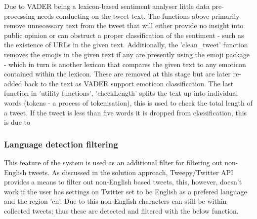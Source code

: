 \documentclass[oneside, 12pt]{article}
\begin{document}
		    Due to VADER being a lexicon-based sentiment analyser little data pre-processing needs conducting on the tweet text. The functions above primarily remove unnecessary text from the tweet that will either provide no insight into public opinion or can obstruct a proper classification of the sentiment - such as the existence of URLs in the given text. Additionally, the 'clean\_tweet' function removes the emojis in the given text if any are presently using the emoji package - which in turn is another lexicon that compares the given text to any emoticon contained within the lexicon. These are removed at this stage but are later re-added back to the text as VADER support emoticon classification. 
			The last function in 'utility functions', 'checkLength' splits the text up into individual words (tokens - a process of tokenisation), this is used to check the total length of a tweet. If the tweet is less than five words it is dropped from classification, this is due to 
			
			\subsubsection{Language detection filtering}
			
			This feature of the system is used as an additional filter for filtering out non-English tweets. As discussed in the solution approach, Tweepy/Twitter API provides a means to filter out non-English based tweets, this, however, doesn't work if the user has settings on Twitter set to be English as a prefered language and the region 'en'. Due to this non-English characters can still be within collected tweets; thus these are detected and filtered with the below function.
			
\end{document}
